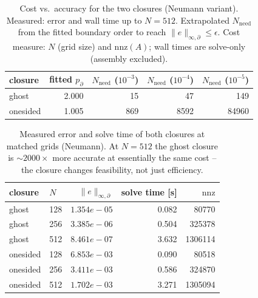 \begin{table}[H]
\centering\small
\caption{Cost vs.\ accuracy for the two closures (Neumann variant).  Measured: error and wall time up to $N=512$. Extrapolated $N_{\mathrm{need}}$ from the fitted boundary order to reach $\lVert e\rVert_{\infty,\partial}\le\epsilon$. Cost measure: $N$ (grid size) and $\mathrm{nnz}(A)$; wall times are solve-only (assembly excluded).}
\label{tab:cost}
\begin{tabular}{lrrrr}
\toprule
closure & fitted $p_{\partial}$ & $N_{\mathrm{need}}$ ($10^{-3}$) & $N_{\mathrm{need}}$ ($10^{-4}$) & $N_{\mathrm{need}}$ ($10^{-5}$) \\
\midrule
ghost & 2.000 & 15 & 47 & 149 \\
onesided & 1.005 & 869 & 8592 & 84960 \\
\bottomrule
\end{tabular}
\end{table}

\begin{table}[H]
\centering\small
\caption{Measured error and solve time of both closures at matched grids (Neumann).  At $N=512$ the ghost closure is $\sim2000\times$ more accurate at essentially the same cost -- the closure changes feasibility, not just efficiency.}
\label{tab:cost-measured}
\begin{tabular}{llrrr}
\toprule
closure & $N$ & $\lVert e\rVert_{\infty,\partial}$ & solve time [s] & $\mathrm{nnz}$ \\
\midrule
ghost & 128 & $1.354e-05$ & 0.082 & 80770 \\
ghost & 256 & $3.385e-06$ & 0.504 & 325378 \\
ghost & 512 & $8.461e-07$ & 3.632 & 1306114 \\
onesided & 128 & $6.853e-03$ & 0.090 & 80518 \\
onesided & 256 & $3.411e-03$ & 0.586 & 324870 \\
onesided & 512 & $1.702e-03$ & 3.271 & 1305094 \\
\bottomrule
\end{tabular}
\end{table}